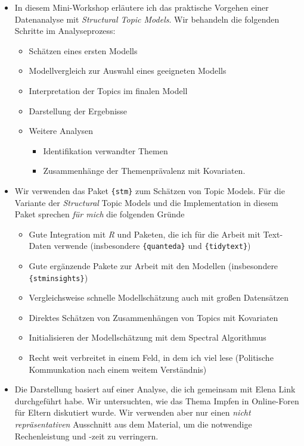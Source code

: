 \documentclass[
]{book}
\providecommand{\tightlist}{%
  \setlength{\itemsep}{0pt}\setlength{\parskip}{0pt}}
\begin{document}
\begin{itemize}
\tightlist
\item
  In diesem Mini-Workshop erläutere ich das praktische Vorgehen einer Datenanalyse mit \emph{Structural Topic Models}. Wir behandeln die folgenden Schritte im Analyseprozess:

  \begin{itemize}
  \tightlist
  \item
    Schätzen eines ersten Modells
  \item
    Modellvergleich zur Auswahl eines geeigneten Modells
  \item
    Interpretation der Topics im finalen Modell
  \item
    Darstellung der Ergebnisse
  \item
    Weitere Analysen

    \begin{itemize}
    \tightlist
    \item
      Identifikation verwandter Themen
    \item
      Zusammenhänge der Themenprävalenz mit Kovariaten.
    \end{itemize}
  \end{itemize}
\item
  Wir verwenden das Paket \texttt{\{stm\}} \citep{robertsStmPackageStructural2019} zum Schätzen von Topic Models. Für die Variante der \emph{Structural} Topic Models und die Implementation in diesem Paket sprechen \emph{für mich} die folgenden Gründe

  \begin{itemize}
  \tightlist
  \item
    Gute Integration mit \emph{R} und Paketen, die ich für die Arbeit mit Text-Daten verwende (insbesondere \texttt{\{quanteda\}} und \texttt{\{tidytext\}})
  \item
    Gute ergänzende Pakete zur Arbeit mit den Modellen (insbesondere \texttt{\{stminsights\}})
  \item
    Vergleichsweise schnelle Modellschätzung auch mit großen Datensätzen
  \item
    Direktes Schätzen von Zusammenhängen von Topics mit Kovariaten
  \item
    Initialisieren der Modellschätzung mit dem Spectral Algorithmus
  \item
    Recht weit verbreitet in einem Feld, in dem ich viel lese (Politische Kommunkation nach einem weitem Verständnis)
  \end{itemize}
\item
  Die Darstellung basiert auf einer Analyse, die ich gemeinsam mit Elena Link durchgeführt habe. Wir untersuchten, wie das Thema Impfen in Online-Foren für Eltern diskutiert wurde. Wir verwenden aber nur einen \emph{nicht repräsentativen} Ausschnitt aus dem Material, um die notwendige Rechenleistung und -zeit zu verringern.


\end{itemize}
\end{document}
